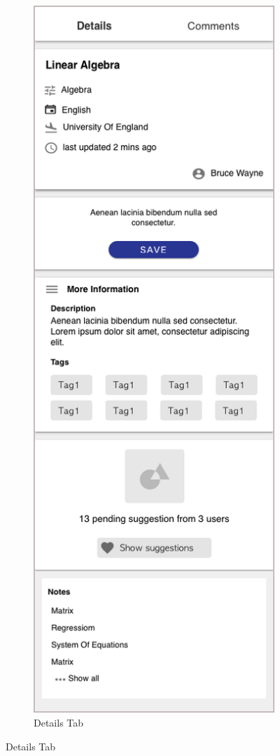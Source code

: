 \documentclass[thesis=B,english]{FITthesis}[2012/10/20]
\begin{document}
\begin{figure}[H]
\begin{subfigure}{.5\textwidth}
  \includegraphics[scale=0.45]{comments}
  \caption{Details Tab}
  \label{fig:published-details}

\end{subfigure}
\end{figure}
\end{document}
